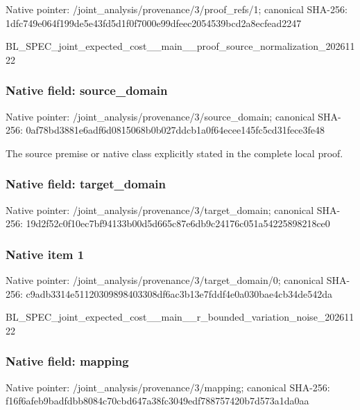 \documentclass[10pt,a4paper]{article}
\begin{document}
Native pointer: /joint\_analysis/provenan\allowbreak{}ce/3/proof\_refs/1; canonical SHA-256: 1dfc749e064f199de5e43fd5\allowbreak{}d1f0f7000e99dfeec2054539\allowbreak{}bcd2a8ecfead2247


BL\_SPEC\_joint\_expected\_c\allowbreak{}ost\_\_main\_\_proof\_source\_\allowbreak{}normalization\_20261122


\subsubsection{Native field: source\_domain}


Native pointer: /joint\_analysis/provenan\allowbreak{}ce/3/source\_domain; canonical SHA-256: 0af78bd3881e6adf6d081506\allowbreak{}8b0b027ddcb1a0f64ecee145\allowbreak{}fc5cd31fece3fe48


The source premise or native class explicitly stated in the complete local proof.


\subsubsection{Native field: target\_domain}


Native pointer: /joint\_analysis/provenan\allowbreak{}ce/3/target\_domain; canonical SHA-256: 19d2f52c0f10ec7bf94133b0\allowbreak{}0d5d665c87e6db9c24176c05\allowbreak{}1a54225898218ce0



\subsubsection{Native item 1}


Native pointer: /joint\_analysis/provenan\allowbreak{}ce/3/target\_domain/0; canonical SHA-256: c9adb3314e51120309898403\allowbreak{}308df6ac3b13e7fddf4e0a03\allowbreak{}0bae4cb34de542da


BL\_SPEC\_joint\_expected\_c\allowbreak{}ost\_\_main\_\_r\_bounded\_var\allowbreak{}iation\_noise\_20261122


\subsubsection{Native field: mapping}


Native pointer: /joint\_analysis/provenance/3/mapping; canonical SHA-256: f16f6afeb9badfdbb8084c70\allowbreak{}cbd647a38fc3049edf788757\allowbreak{}420b7d573a1da0aa
\end{document}

